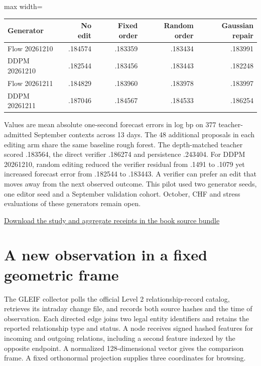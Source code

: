 \documentclass[11pt,oneside,openany]{book}
\begin{document}
\begin{center}\footnotesize\sffamily\setlength{\tabcolsep}{3.5pt}\renewcommand{\arraystretch}{1.2}
\begin{adjustbox}{max width=\linewidth}\begin{tabular}{@{}lrrrr@{}}\toprule
Generator  & No edit  & Fixed order  & Random order  & Gaussian repair \\ \midrule
Flow 20261210  & .184574  & .183359  & .183434  & .183991 \\
DDPM 20261210  & .182544  & .183456  & .183443  & .182248 \\
Flow 20261211  & .184829  & .183960  & .183978  & .183997 \\
DDPM 20261211  & .187046  & .184567  & .184533  & .186254 \\
\bottomrule\end{tabular}\end{adjustbox}\end{center}
Values are mean absolute one-second forecast errors in log bp on 377 teacher-admitted September contexts across 13 days. The 48 additional proposals in each editing arm share the same baseline rough forest. The depth-matched teacher scored .183564, the direct verifier .186274 and persistence .243404. For DDPM 20261210, random editing reduced the verifier residual from .1491 to .1079 yet increased forecast error from .182544 to .183443. A verifier can prefer an edit that moves away from the next observed outcome. This pilot used two generator seeds, one editor seed and a September validation cohort. October, CHF and stress evaluations of these generators remain open.

{\small\sffamily\href{https://amelie-iska.github.io/phaseweave-lab/book/phaseweave-source.zip}{Download the study and aggregate receipts in the book source bundle}\par}
\section*{A new observation in a fixed geometric frame}
The GLEIF collector polls the official Level 2 relationship-record catalog, retrieves its intraday change file, and records both source hashes and the time of observation. Each directed edge joins two legal entity identifiers and retains the reported relationship type and status. A node receives signed hashed features for incoming and outgoing relations, including a second feature indexed by the opposite endpoint. A normalized 128-dimensional vector gives the comparison frame. A fixed orthonormal projection supplies three coordinates for browsing.
\end{document}
